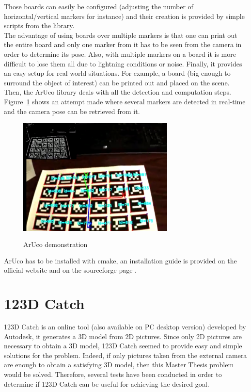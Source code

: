 Those boards can easily be configured (adjusting the number of horizontal/vertical markers for instance) and their creation is provided by simple scripts from the library.\\

The advantage of using boards over multiple markers is that one can print out the entire board and only one marker from it has to be seen from the camera in order to determine its pose. Also, with multiple markers on a board it is more difficult to lose them all due to lightning conditions or noise. Finally, it provides an easy setup for real world situations. For example, a board (big enough to surround the object of interest) can be printed out and placed on the scene. Then, the ArUco library deals with all the detection and computation steps. Figure~\ref{fig:aruco-demo} \cite{aruco} shows an attempt made where several markers are detected in real-time and the camera pose can be retrieved from it.\\

\begin{figure}[t]
\caption{ArUco demonstration}
\centering
    \includegraphics[width=0.7\textwidth]{images/aruco-demo.png}
\label{fig:aruco-demo}
\end{figure}

ArUco has to be installed with cmake, an installation guide is provided on the official website \cite{aruco} and on the sourceforge page \cite{augmented}. 

\section{123D Catch}
123D Catch is an online tool \cite{123DCatch} (also available on PC desktop version) developed by Autodesk, it generates a 3D model from 2D pictures. Since only 2D pictures are necessary to obtain a 3D model, 123D Catch seemed to provide easy and simple solutions for the problem. Indeed, if only pictures taken from the external camera are enough to obtain a satisfying 3D model, then this Master Thesis problem would be solved. Therefore, several tests have been conducted in order to determine if 123D Catch can be useful for achieving the desired goal.\\ 

